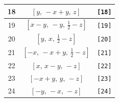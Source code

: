 \documentclass[fleqn,8pt]{jsarticle}
\begin{document}
\begin{longtable}{ccc}
18 & $\left[ y,\, - x + y,\, z \right]$ & {\tt [18]} \\ \hline
19 & $\left[ x - y,\, - y,\, \frac{1}{2} - z \right]$ & {\tt [19]} \\ \hline
20 & $\left[ y,\, x,\, \frac{1}{2} - z \right]$ & {\tt [20]} \\ \hline
21 & $\left[ - x,\, - x + y,\, \frac{1}{2} - z \right]$ & {\tt [21]} \\ \hline
22 & $\left[ x,\, x - y,\, - z \right]$ & {\tt [22]} \\ \hline
23 & $\left[ - x + y,\, y,\, - z \right]$ & {\tt [23]} \\ \hline
24 & $\left[ - y,\, - x,\, - z \right]$ & {\tt [24]} \\
\end{longtable}
\end{document}
